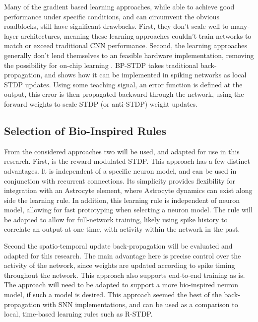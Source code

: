     Many of the gradient based learning approaches, while able to achieve good
    performance under specific conditions, and can circumvent the obvious
    roadblocks, still have significant drawbacks. First, they don't scale well
    to many-layer architectures, meaning these learning approaches couldn't
    train networks to match or exceed traditional CNN performance. Second, the
    learning approaches generally don't lend themselves to an feasible hardware
    implementation, removing the possibility for on-chip learning
    \cite{bp_stdp}. BP-STDP takes traditional back-propagation, and shows how it
    can be implemented in spiking networks as local STDP updates. Using some
    teaching signal, an error function is defined at the output, this error is
    then propagated backward through the network, using the forward weights to
    scale STDP (or anti-STDP) weight updates.
    
    \subsection{Selection of Bio-Inspired Rules}
    From the considered approaches two will be used, and adapted for use in this
    research. First, is the reward-modulated STDP. This approach has a few
    distinct advantages. It is independent of a specific neuron model, and can
    be used in conjunction with recurrent connections. Its simplicity provides
    flexibility for integration with an Astrocyte element, where Astrocyte
    dynamics can exist along side the learning rule. In addition, this learning
    rule is independent of neuron model, allowing for fast prototyping when
    selecting a neuron model. The rule will be adapted to allow for full-network
    training, likely using spike history to correlate an output at one time,
    with activity within the network in the past.
    
    Second the spatio-temporal update back-propagation will be evaluated and
    adapted for this research. The main advantage here is precise control over
    the activity of the network, since weights are updated according to spike
    timing throughout the network. This approach also supports end-to-end
    training as is. The approach will need to be adapted to support a more
    bio-inspired neuron model, if such a model is desired. This approach seemed
    the best of the back-propagation with SNN implementations, and can be used
    as a comparison to local, time-based learning rules such as R-STDP.
    
